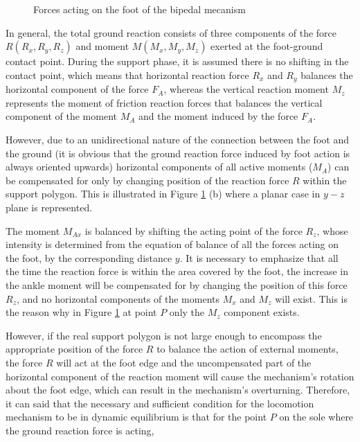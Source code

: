 \begin{figure}[!hbt]
\centering
{}
\caption{Forces acting on the foot of the bipedal mecanism \protect\cite{Vuk2004} }
\label{fig:pie}
\end{figure}

In general, the total ground reaction consists of three components of the force $R (R_x, R_y, R_z)$ and moment $M (M_x, M_y, M_z)$ exerted at the foot-ground contact point. During the support phase, it is assumed there is no shifting in the contact point, which means that horizontal reaction force $R_x$ and $R_y$ balances the horizontal component of the force $F_A$, whereas the vertical reaction moment $M_z$ represents the moment of friction reaction forces that balances the vertical component of the moment $M_A$ and the moment induced by the force $F_A$.

However, due to an unidirectional nature of the connection between the foot and the ground (it is obvious that the ground reaction force induced by foot action is always oriented upwards) horizontal components of all active moments ($M_A$) can be compensated for only by changing position of the reaction force $R$ within the support polygon. This is illustrated in Figure \ref{fig:pie} (b) where a planar case in $y-z$ plane is represented.

The moment $M_{Ax}$ is balanced by shifting the acting point of the force $R_z$, whose intensity is determined from the equation of balance of all the forces acting on the foot, by the corresponding distance $y$. It is necessary to emphasize that all the time the reaction force is within the area covered by the foot, the increase in the ankle moment will be compensated for by changing the position of this force $R_z$, and no horizontal components of the moments $M_x$ and $M_z$ will exist. This is the reason why in Figure \ref{fig:pie} at point $P$ only the $M_z$ component exists.

However, if the real support polygon is not large enough to encompass the appropriate position of the force $R$ to balance the action of external moments, the force $R$ will act at the foot edge and the uncompensated part of the horizontal component of the reaction moment will cause the mechanism’s rotation about the foot edge, which can result in the mechanism’s overturning. Therefore, it can said that the necessary and sufficient condition for the locomotion mechanism to be in dynamic equilibrium is that for the point $P$ on the sole where the ground reaction force is acting,

